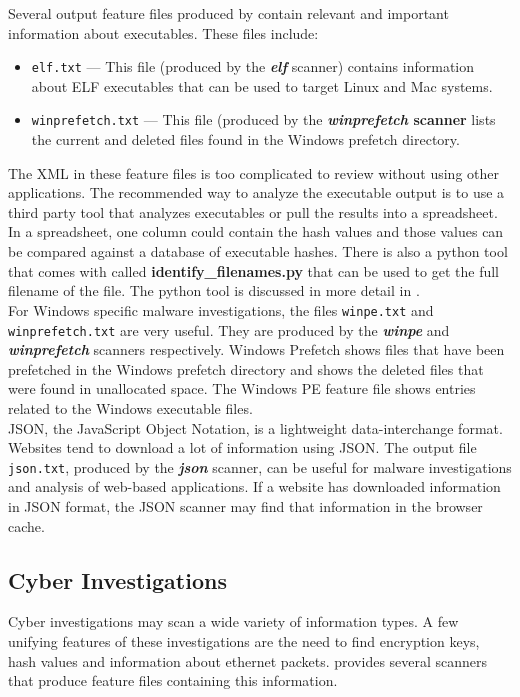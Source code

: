 \documentclass[11pt]{article} %
\begin{document}
Several output feature files produced by \bulk contain relevant and important information about executables. These files include:
\begin{itemize}
\item \texttt{elf.txt} --- This file (produced by the \textbf{\textit{elf}} scanner) contains information about ELF executables that can be used to target Linux and Mac systems.
\item \texttt{winprefetch.txt} --- This file (produced by the \textbf{\textit{winprefetch} scanner} lists the current and deleted files found in the Windows prefetch directory.
\end{itemize}
The XML in these feature files is too complicated to review without using other applications. The recommended way to analyze the executable output is to use a third party tool that analyzes executables or pull the results into a spreadsheet. In a spreadsheet, one column could contain the hash values and those values can be compared against a database of executable hashes. There is also a python tool that comes with \bulk called \textbf{identify\_filenames.py} that can be used to get the full filename of the file. The python tool is discussed in more detail in \textbf{}.\\

For Windows specific malware investigations, the files \texttt{winpe.txt} and \texttt{winprefetch.txt} are very useful. They are produced by the \textbf{\textit{winpe}} and \textbf{\textit{winprefetch}} scanners respectively.  Windows Prefetch shows files that have been prefetched in the Windows prefetch directory and shows the deleted files that were found in unallocated space. The Windows PE feature file shows entries related to the Windows executable files. \\

JSON, the JavaScript Object Notation, is a lightweight data-interchange format. Websites tend to download a lot of information using JSON. The output file \texttt{json.txt}, produced by the \textbf{\textit{json}} scanner, can be useful for malware investigations and analysis of web-based applications. If a website has downloaded information in JSON format, the JSON scanner may find that information in the browser cache. 

\subsection{Cyber Investigations}
\label{cyber}
Cyber investigations may scan a wide variety of information types. A few unifying features of these investigations are the need to find encryption keys, hash values and information about ethernet packets. \bulk provides several scanners that produce feature files containing this information.\\
\end{document}

